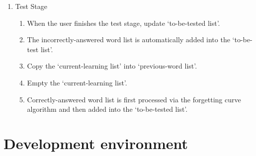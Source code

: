 \documentclass[conference]{IEEEtran}
\begin{document}
\begin{enumerate}
\begin{enumerate}
\begin{enumerate}
        \end{enumerate}
    \item Test Stage
        \begin{enumerate}
        \item When the user finishes the test stage, update ‘to-be-tested list’.
        \item The incorrectly-answered word list is automatically added into the ‘to-be-test list’.
        \item Copy the ‘current-learning list’ into ‘previous-word list’.
        \item Empty the ‘current-learning list’.
        \item Correctly-answered word list is first processed via the forgetting curve algorithm and then added into the ‘to-be-tested list’.
        \end{enumerate}
    \end{enumerate}
\end{enumerate}




\section{Development environment}
\end{document}
